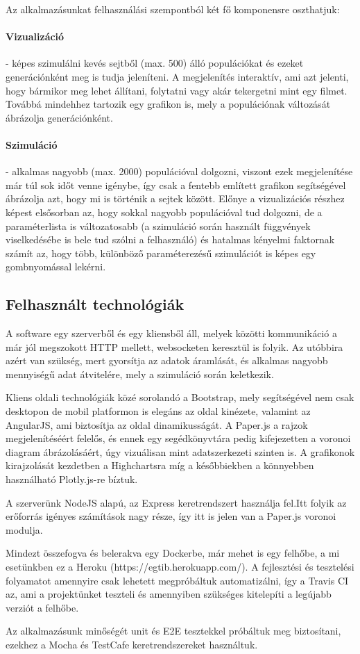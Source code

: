 Az alkalmazásunkat felhasználási szempontból két fő komponensre oszthatjuk:

\paragraph{Vizualizáció}- képes szimulálni kevés sejtből (max. 500) álló populációkat és ezeket generációnként meg is tudja jeleníteni. A megjelenítés interaktív, ami azt jelenti, hogy bármikor meg lehet állítani, folytatni vagy akár tekergetni mint egy filmet. Továbbá mindehhez tartozik egy grafikon is, mely a populációnak változását ábrázolja generációnként.

\paragraph{Szimuláció}- alkalmas nagyobb (max. 2000) populációval dolgozni, viszont ezek megjelenítése már túl sok időt venne igénybe, így csak a fentebb említett grafikon segítségével ábrázolja azt, hogy mi is történik a sejtek között. Előnye a vizualizációs részhez képest elsősorban az, hogy sokkal nagyobb populációval tud dolgozni, de a paraméterlista is változatosabb (a szimuláció során használt függvények viselkedésébe is bele tud szólni a felhasználó) és hatalmas kényelmi faktornak számít az, hogy több, különböző paraméterezésű szimulációt is képes egy gombnyomással lekérni.

\subsection{Felhasznált technológiák}

A software egy szerverből és egy kliensből áll, melyek közötti kommunikáció a már jól megszokott HTTP mellett, websocketen keresztül is folyik. Az utóbbira azért van szükség, mert gyorsítja az adatok áramlását, és alkalmas nagyobb mennyiségű adat átvitelére, mely a szimuláció során keletkezik. 

Kliens oldali technológiák közé sorolandó a Bootstrap, mely segítségével nem csak desktopon de mobil platformon is elegáns az oldal kinézete, valamint az AngularJS, ami biztosítja az oldal dinamikusságát. A Paper.js a rajzok megjelenítéséért felelős, és ennek egy segédkönyvtára pedig kifejezetten a voronoi diagram ábrázolásáért, úgy vizuálisan mint adatszerkezeti szinten is. A grafikonok kirajzolását kezdetben a Highchartsra míg a későbbiekben a könnyebben használható Plotly.js-re bíztuk.

A szerverünk NodeJS alapú, az Express keretrendszert használja fel.Itt folyik az erőforrás igényes számítások nagy része, így itt is jelen van a Paper.js voronoi modulja.

Mindezt összefogva és belerakva egy Dockerbe, már mehet is egy felhőbe, a mi esetünkben ez a Heroku (https://egtib.herokuapp.com/). A fejlesztési és tesztelési folyamatot amennyire csak lehetett megpróbáltuk automatizálni, így a Travis CI az, ami a projektünket teszteli és amennyiben szükséges kitelepíti a legújabb verziót a felhőbe.

Az alkalmazásunk minőségét unit és E2E tesztekkel próbáltuk meg biztosítani, ezekhez a Mocha és TestCafe keretrendszereket használtuk. 
